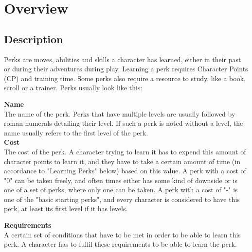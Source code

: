 \chapter{Overview}
\section{Description}
Perks are moves, abilities and skills a character has learned, either in their past or during their adventures during play. Learning a perk requires Character Points (CP) and training time. Some perks also require a resource to study, like a book, scroll or a trainer. Perks usually look like this:

\textbf{Name}\\
The name of the perk. Perks that have multiple levels are usually followed by roman numerals detailing their level. If such a perk is noted without a level, the name usually refers to the first level of the perk.\\

\textbf{Cost}\\
The cost of the perk. A character trying to learn it has to expend this amount of character points to learn it, and they have to take a certain amount of time (in accordance to "Learning Perks" below) based on this value. A perk with a cost of "0" can be taken freely, and often times either has some kind of downside or is one of a set of perks, where only one can be taken. A perk with a cost of "-" is one of the "basic starting perks", and every character is considered to have this perk, at least its first level if it has levels.

\textbf{Requirements}\\
A certain set of conditions that have to be met in order to be able to learn this perk. A character has to fulfil these requirements to be able to learn the perk.

